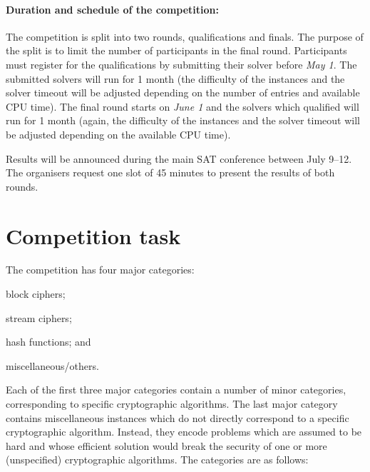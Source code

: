 \documentclass[12pt, a4paper]{article}
\begin{document}
\paragraph{Duration and schedule of the competition:} The competition is split into two rounds, qualifications and finals. The purpose of the split is to limit the number of participants in the final round. Participants must register for the qualifications by submitting their solver before \emph{May 1}. The submitted solvers will run for 1 month (the difficulty of the instances and the solver timeout will be adjusted depending on the number of entries and available CPU time). The final round starts on \emph{June 1} and the solvers which qualified will run for 1 month (again, the difficulty of the instances and the solver timeout will be adjusted depending on the available CPU time).

Results will be announced during the main SAT conference between July 9--12. The organisers request one slot of 45 minutes to present the results of both rounds.

\section{Competition task}

The competition has four major categories:
\begin{inparaenum}[(1)]
\item block ciphers;
\item stream ciphers;
\item hash functions; and
\item miscellaneous/others.
\end{inparaenum}
Each of the first three major categories contain a number of minor categories, corresponding to specific cryptographic algorithms. The last major category contains miscellaneous instances which do not directly correspond to a specific cryptographic algorithm. Instead, they encode problems which are assumed to be hard and whose efficient solution would break the security of one or more (unspecified) cryptographic algorithms. The categories are as follows:
\end{document}
